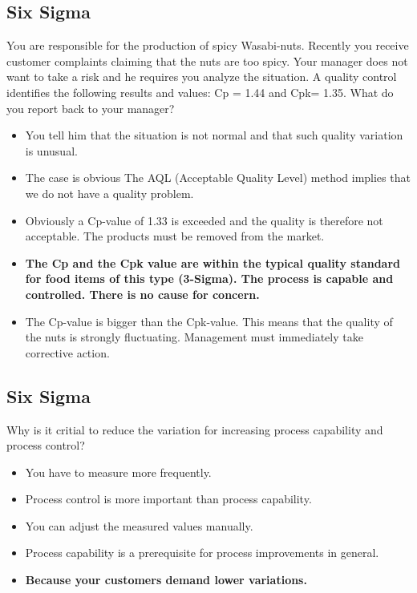 \subsection{Six Sigma}
You are responsible for the production of spicy Wasabi-nuts. Recently you receive customer complaints claiming that the nuts are too spicy. Your manager does not want to take a risk and he requires you analyze the situation. A quality control identifies the following results and values: Cp = 1.44 and Cpk= 1.35. What do you report back to your manager?
\begin{itemize}
	\item You tell him that the situation is not normal and that such quality variation is unusual.
	\item The case is obvious The AQL (Acceptable Quality Level) method implies that we do not have a quality problem.
	\item Obviously a Cp-value of 1.33 is exceeded and the quality is therefore not acceptable. The products must be removed from the market.
	\item \textbf{The Cp and the Cpk value are within the typical quality standard for food items of this type (3-Sigma). The process is capable and controlled. There is no cause for concern.}
	\item The Cp-value is bigger than the Cpk-value. This means that the quality of the nuts is strongly fluctuating. Management must immediately take corrective action.
\end{itemize}
\subsection{Six Sigma}
 Why is it critial to reduce the variation for increasing process capability and process control?
 \begin{itemize}
 \item You have to measure more frequently.  
 \item Process control is more important than process capability. 
 \item You can adjust the measured values manually. 
 \item Process capability is a prerequisite for process improvements in general. 
 \item \textbf{Because your customers demand lower variations. }
 \end{itemize}